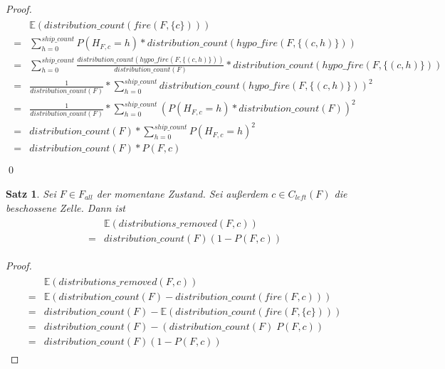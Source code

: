 \documentclass[a4paper,12pt]{llncs}
\numberwithin{equation}{section}
\newtheorem{satz}{Satz}
\begin{document}
\begin{proof}
\begin{align}
\begin{split}
&\mathds{E}(distribution\_count(fire(F,\{c\})))\\
=&\sum_{h=0}^{ship\_count} P(H_{F,c} = h) * distribution\_count(hypo\_fire(F,\{(c,h)\}))\\
=&\sum_{h=0}^{ship\_count} \frac{distribution\_count(hypo\_fire(F,\{(c,h)\}))}{distribution\_count(F)}* distribution\_count(hypo\_fire(F,\{(c,h)\}))\\
=&\frac{1}{distribution\_count(F)} * \sum_{h=0}^{ship\_count} distribution\_count(hypo\_fire(F,\{(c,h)\}))^2\\
=&\frac{1}{distribution\_count(F)} * \sum_{h=0}^{ship\_count} (P(H_{F,c} = h) * distribution\_count(F))^2\\
=&distribution\_count(F) * \sum_{h=0}^{ship\_count} P(H_{F,c} = h)^2\\
=&distribution\_count(F) * P(F,c)\\
\end{split}
\end{align}
\qed
\end{proof}

\begin{satz}
Sei $F\in F_{all}$ der momentane Zustand.
Sei außerdem $c \in C_{left}(F)$ die beschossene Zelle.
Dann ist
\begin{align}
\begin{split}
&\mathds{E}(distributions\_removed(F,c))\\
=&distribution\_count(F) (1 - P(F,c))
\end{split}
\end{align}
\end{satz}

\begin{proof}
\begin{align}
\begin{split}
&\mathds{E}(distributions\_removed(F,c))\\
=&\mathds{E}(distribution\_count(F) - distribution\_count(fire(F,c)))\\
=&distribution\_count(F) - \mathds{E}(distribution\_count(fire(F,\{c\})))\\
=&distribution\_count(F) - (distribution\_count(F)\; P(F,c))\\
=&distribution\_count(F) (1 - P(F,c))
\end{split}
\end{align}
\end{proof}
\end{document}
